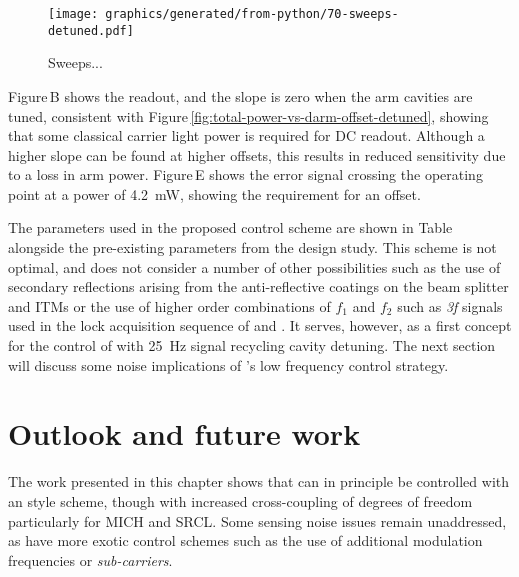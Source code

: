 \begin{figure}
  \centering
  \texttt{[image: graphics/generated/from-python/70-sweeps-detuned.pdf]}
  \caption[Sweeps through the zero-crossings of the chosen error signals in ET-LF]{\label{fig:sweeps-et-lf}Sweeps...}
\end{figure}

Figure\,B shows the \ASDC{} readout, and the slope is zero when the arm cavities are tuned, consistent with Figure\,\ref{fig:total-power-vs-darm-offset-detuned}, showing that some classical carrier light power is required for \gls{DC} readout. Although a higher slope can be found at higher offsets, this results in reduced sensitivity due to a loss in arm power. Figure\,E shows the error signal crossing the operating point at a power of \SI{4.2}{\milli\watt}, showing the requirement for an offset.

The parameters used in the proposed control scheme are shown in Table\, alongside the pre-existing parameters from the design study. This scheme is not optimal, and does not consider a number of other possibilities such as the use of secondary reflections arising from the anti-reflective coatings on the beam splitter and \glspl{ITM} or the use of higher order combinations of $f_1$ and $f_2$ such as \emph{3f} signals used in the lock acquisition sequence of \VIRGO{} \cite{Acernese2008} and \ALIGO{} \cite{Staley2014}. It serves, however, as a first concept for the control of \ETLF{} with \SI{25}{\hertz} signal recycling cavity detuning. The next section will discuss some noise implications of \ETLF{}'s low frequency control strategy.


\section{Outlook and future work}
The work presented in this chapter shows that \ETLF{} can in principle be controlled with an \ALIGO{} style scheme, though with increased cross-coupling of degrees of freedom particularly for \gls{MICH} and \gls{SRCL}. Some sensing noise issues remain unaddressed, as have more exotic control schemes such as the use of additional modulation frequencies or \emph{sub-carriers}.

